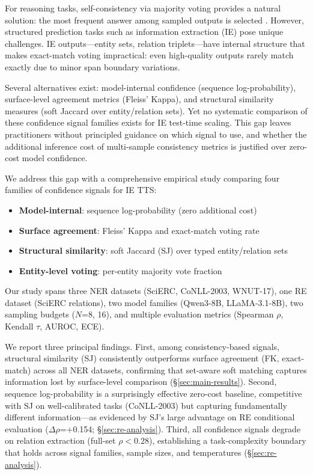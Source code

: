 \documentclass[11pt,a4paper]{article}
\newcommand{\SJ}{\textsc{SJ}}
\newcommand{\FK}{\textsc{FK}}
\begin{document}
For reasoning tasks, self-consistency via majority voting provides a natural solution: the most frequent answer among sampled outputs is selected \cite{wang2023selfconsistency}.
However, structured prediction tasks such as information extraction (IE) pose unique challenges.
IE outputs---entity sets, relation triplets---have internal structure that makes exact-match voting impractical: even high-quality outputs rarely match exactly due to minor span boundary variations.

Several alternatives exist: model-internal confidence (sequence log-probability), surface-level agreement metrics (Fleiss' Kappa), and structural similarity measures (soft Jaccard over entity/relation sets).
Yet no systematic comparison of these confidence signal families exists for IE test-time scaling.
This gap leaves practitioners without principled guidance on which signal to use, and whether the additional inference cost of multi-sample consistency metrics is justified over zero-cost model confidence.

We address this gap with a comprehensive empirical study comparing four families of confidence signals for IE TTS:
\begin{itemize}
    \item \textbf{Model-internal}: sequence log-probability (zero additional cost)
    \item \textbf{Surface agreement}: Fleiss' Kappa and exact-match voting rate
    \item \textbf{Structural similarity}: soft Jaccard (\SJ{}) over typed entity/relation sets
    \item \textbf{Entity-level voting}: per-entity majority vote fraction
\end{itemize}

Our study spans three NER datasets (SciERC, CoNLL-2003, WNUT-17), one RE dataset (SciERC relations), two model families (Qwen3-8B, LLaMA-3.1-8B), two sampling budgets ($N$=8, 16), and multiple evaluation metrics (Spearman $\rho$, Kendall $\tau$, AUROC, ECE).

We report three principal findings.
First, among consistency-based signals, structural similarity (\SJ{}) consistently outperforms surface agreement (\FK{}, exact-match) across all NER datasets, confirming that set-aware soft matching captures information lost by surface-level comparison (\S\ref{sec:main-results}).
Second, sequence log-probability is a surprisingly effective zero-cost baseline, competitive with \SJ{} on well-calibrated tasks (CoNLL-2003) but capturing fundamentally different information---as evidenced by \SJ{}'s large advantage on RE conditional evaluation ($\Delta\rho$=+0.154; \S\ref{sec:re-analysis}).
Third, all confidence signals degrade on relation extraction (full-set $\rho < 0.28$), establishing a task-complexity boundary that holds across signal families, sample sizes, and temperatures (\S\ref{sec:re-analysis}).
\end{document}

